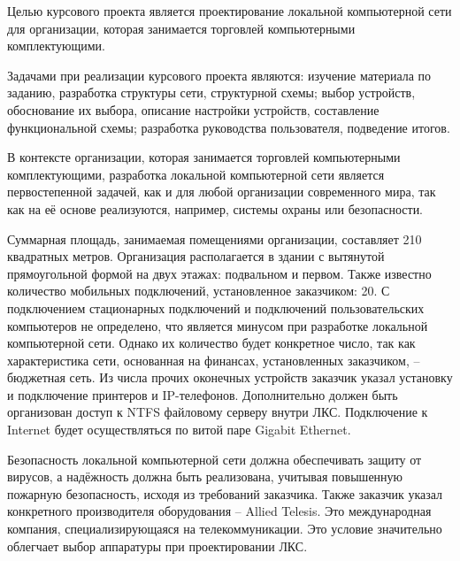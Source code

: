 
Целью курсового проекта является проектирование локальной компьютерной сети для организации, которая занимается торговлей компьютерными комплектующими.

Задачами при реализации курсового проекта являются:
изучение материала по заданию,
разработка структуры сети,
структурной схемы;
выбор устройств,
обоснование их выбора,
описание настройки устройств,
составление функциональной схемы;
разработка руководства пользователя,
подведение итогов.

В контексте организации, которая занимается торговлей компьютерными комплектующими, разработка локальной компьютерной сети является первостепенной задачей, как и для любой организации современного мира, так как на её основе реализуются, например, системы охраны или безопасности.

Суммарная площадь, занимаемая помещениями организации, составляет 210 квадратных метров.
Организация располагается в здании с вытянутой прямоугольной формой на двух этажах: подвальном и первом.
Также известно количество мобильных подключений, установленное заказчиком: 20.
С подключением стационарных подключений и подключений пользовательских компьютеров не определено, что является минусом при разработке локальной компьютерной сети.
Однако их количество будет конкретное число, так как характеристика сети, основанная на финансах, установленных заказчиком, – бюджетная сеть.
Из числа прочих оконечных устройств заказчик указал установку и подключение принтеров и IP-телефонов.
Дополнительно должен быть организован доступ к NTFS файловому серверу внутри ЛКС.
Подключение к Internet будет осуществляться по витой паре Gigabit Ethernet.

Безопасность локальной компьютерной сети должна обеспечивать защиту от вирусов, а надёжность должна быть реализована, учитывая повышенную пожарную безопасность, исходя из требований заказчика.
Также заказчик указал конкретного производителя оборудования – Allied Telesis.
Это международная компания, специализирующаяся на телекоммуникации.
Это условие значительно облегчает выбор аппаратуры при проектировании ЛКС.

\newpage
